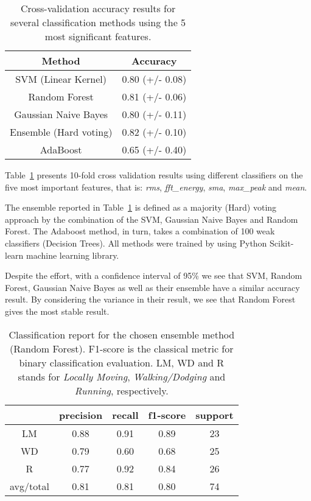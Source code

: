 \begin{table}[h]\footnotesize
  \centering
  \caption{Cross-validation accuracy results for several classification methods using the 5 most significant features.%
  }
  \begin{tabular}{| c | c |}
    \hline
  	   \textbf{Method}          & \textbf{Accuracy}\\\hline
       SVM (Linear Kernel)      & 0.80 (+/- 0.08)  \\\hline
       Random Forest            & 0.81 (+/- 0.06)  \\\hline
       Gaussian Naive Bayes     & 0.80 (+/- 0.11)  \\\hline
       Ensemble (Hard voting)   & 0.82 (+/- 0.10)  \\\hline
       AdaBoost                 & 0.65 (+/- 0.40)   \\\hline
  \end{tabular}
  \label{accuracy5best}
\end{table}


Table~\ref{accuracy5best} presents 10-fold cross validation results using different classifiers on the five most important features, that is: \textit{rms}, \textit{fft\_energy}, \textit{sma}, \textit{max\_peak} and \textit{mean}. 

The ensemble reported in Table~\ref{accuracy5best} is defined as a majority (Hard) voting approach by the combination of the SVM, Gaussian Naive Bayes and Random Forest. The Adaboost method, in turn, takes a combination of 100 weak classifiers (Decision Trees). All methods were trained by using Python Scikit-learn machine learning library.

Despite the effort, with a confidence interval of 95\% we see that SVM, Random Forest, Gaussian Naive Bayes as well as their ensemble have a similar accuracy result. By considering the variance in their result, we see that Random Forest gives the most stable result. 

\begin{table}[h]\footnotesize
  \centering
  \caption{Classification report for the chosen ensemble method (Random Forest). F1-score is the classical metric for binary classification evaluation. LM, WD and R stands for \textit{Locally Moving}, \textit{Walking/Dodging} and \textit{Running}, respectively. %
  }
  \begin{tabular}{| c | c | c | c | c |}
    \hline
  	   & precision   & recall & f1-score &  support \\\hline
    LM &      0.88   &  0.91  &    0.89  &      23  \\\hline
    WD &      0.79   &  0.60 &     0.68 &       25  \\\hline
     R &      0.77   &  0.92 &     0.84 &       26  \\\hline
avg/total &   0.81   &  0.81 &     0.80 &       74  \\\hline
  \end{tabular}
  \label{report}
\end{table}

